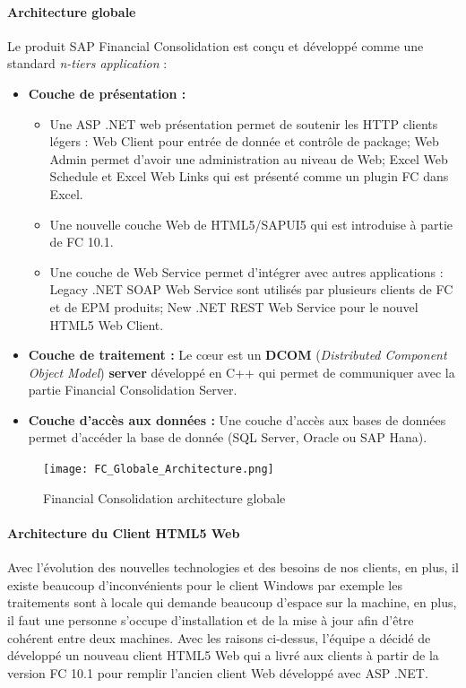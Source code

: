     \paragraph{Architecture globale}
    Le produit SAP Financial Consolidation est conçu et développé comme une standard \textit{n-tiers application} :
    \begin{itemize}[label=\textbullet]
        \item \textbf{Couche de présentation :} 
            \begin{itemize}
                \item Une ASP .NET web présentation permet de soutenir les HTTP clients légers : Web Client pour entrée de donnée et contrôle de package; Web Admin permet d'avoir une administration au niveau de Web; Excel Web Schedule et Excel Web Links qui est présenté comme un plugin FC dans Excel.
                \item Une nouvelle couche Web de HTML5/SAPUI5 qui est introduise à partie de FC 10.1.
                \item Une couche de Web Service permet d'intégrer avec autres applications : Legacy .NET SOAP Web Service sont utilisés par plusieurs clients de FC et de EPM produits; New .NET REST Web Service pour le nouvel HTML5 Web Client.
            \end{itemize}
        \item \textbf{Couche de traitement :} Le cœur est un \textbf{DCOM} (\textit{Distributed Component Object Model}) \textbf{server} développé en C++ qui permet de communiquer avec la partie Financial Consolidation Server.
        \item \textbf{Couche d'accès aux données :} Une couche d'accès aux bases de données permet d'accéder la base de donnée (SQL Server, Oracle ou SAP Hana).
    \end{itemize}
    
    \begin{figure}[H]
        \centering
        \texttt{[image: FC\_Globale\_Architecture.png]}
        \caption{Financial Consolidation architecture globale}
        \label{fig:FC_architecture_label}
    \end{figure}
    
    \paragraph{Architecture du Client HTML5 Web}
    Avec l'évolution des nouvelles technologies et des besoins de nos clients, en plus, il existe beaucoup d’inconvénients pour le client Windows par exemple les traitements sont à locale qui demande beaucoup d'espace sur la machine, en plus, il faut une personne  s'occupe d'installation et de la mise à jour afin d'être cohérent entre deux machines. Avec les raisons ci-dessus, l'équipe a décidé de développé un nouveau client HTML5 Web qui a livré aux clients à partir de la version FC 10.1 pour remplir l'ancien client Web développé avec ASP .NET.
    
